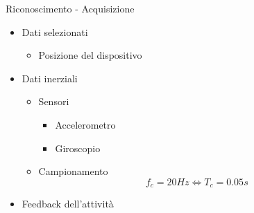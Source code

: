 \begin{tframe}{Riconoscimento - Acquisizione}

    \begin{minipage}{0.60\textwidth}

        \begin{itemize}

            \item Dati selezionati
                \begin{itemize}
                    \item Posizione del dispositivo
                \end{itemize}

            \item Dati inerziali 
                \begin{itemize}
                    \item Sensori
                        \begin{itemize}
                            \item Accelerometro
                            \item Giroscopio
                        \end{itemize}
                    \item Campionamento
                        $$f_c = 20Hz \Longleftrightarrow T_c = 0.05s$$
                \end{itemize}
            \item Feedback dell'attività
        \end{itemize}

    \end{minipage}%
    \hfill
    \begin{minipage}{0.35\textwidth}
        

\end{minipage}
\end{tframe}
